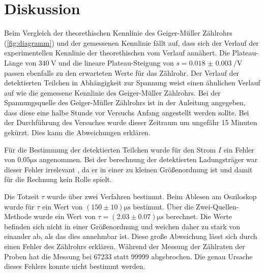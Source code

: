 \section{Diskussion}
\label{sec:diskussion}

Beim Vergleich der theorethischen Kennlinie des Geiger-Müller Zählrohrs (\autoref{fig:diagramm}) und der gemessenen Kennlinie
fällt auf, dass sich der Verlauf der experimentellen Kennlinie der theorethischen vom Verlauf annähert.
Die Plateau-Länge von $\SI{340}{\volt}$ und die lineare Plateau-Steigung von $ s= \qty{0.018(3)}{\per\volt}$ passen ebenfalls
zu den erwarteten Werte für das Zählrohr. Der Verlauf der detektierten Teilchen in Abhängigkeit zur Spannung 
weist einen ähnlichen Verlauf auf wie die gemessene Kennlinie des Geiger-Müller Zählrohrs.
Bei der Spannungsquelle des Geiger-Müller Zählrohrs ist in der Anleitung angegeben, dass diese eine halbe Stunde
vor Versuchs Anfang angestellt werden sollte. Bei der Durchführung des Versuches wurde dieser Zeitraum um ungefähr 15 Minuten 
gekürzt. Dies kann die Abweichungen erklären.

Für die Bestimmung der detektierten Teilchen wurde für den Strom $I$ ein Fehler von $0.05 \si{\micro\second}$ angenommen.
Bei der berechnung der detektierten Ladungsträger war dieser Fehler irrelevant , da er in einer zu kleinen Größenordnung ist und 
damit für die Rechnung kein Rolle spielt.

Die Totzeit $\tau$ wurde über zwei Verfahren bestimmt. Beim Ablesen am Osziloskop wurde für $\tau$ ein Wert von
$\left(150 \pm  10\right) \si{\micro\second}$ bestimmt. Über die Zwei-Quellen-Methode wurde ein Wert von $\tau =\left(2.03 \pm 0.07\right) \si{\micro\second}$
berechnet. Die Werte befinden sich nicht in einer Größenordnung und weichen daher zu stark von einander ab, als das dies annehmbar ist.
Diese große Abweichung lässt sich durch einen Fehler des Zählrohrs erklären. Während der Messung der Zählraten der Proben
hat die Messung bei 67233 statt 99999 abgebrochen. Die genau Ursache dieses Fehlers konnte nicht bestimmt werden.

\newpage